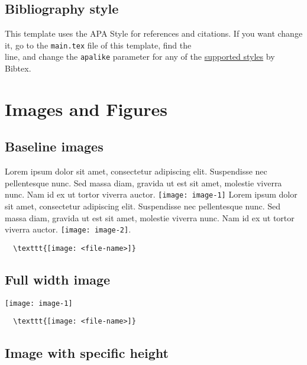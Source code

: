 \subsection{Bibliography style}

This template uses the APA Style for references and citations. If you want change it, go to the \verb|main.tex| file of this template, find the\\\verb|| line, and change the \verb|apalike| parameter for any of the \href{https://www.overleaf.com/learn/latex/Bibtex_bibliography_styles}{supported styles} by Bibtex.

\section{Images and Figures}

\subsection{Baseline images}

Lorem ipsum dolor sit amet, consectetur adipiscing elit. Suspendisse nec pellentesque nunc. Sed massa diam, gravida ut est sit amet, molestie viverra nunc. Nam id ex ut tortor viverra auctor. \texttt{[image: image-1]} Lorem ipsum dolor sit amet, consectetur adipiscing elit. Suspendisse nec pellentesque nunc. Sed massa diam, gravida ut est sit amet, molestie viverra nunc. Nam id ex ut tortor viverra auctor. \texttt{[image: image-2]}.

\begin{lstlisting}
  \texttt{[image: <file-name>]}
\end{lstlisting}

\clearpage
\subsection{Full width image}

\texttt{[image: image-1]}

\begin{lstlisting}
  \texttt{[image: <file-name>]}
\end{lstlisting}

\clearpage
\subsection{Image with specific height}

